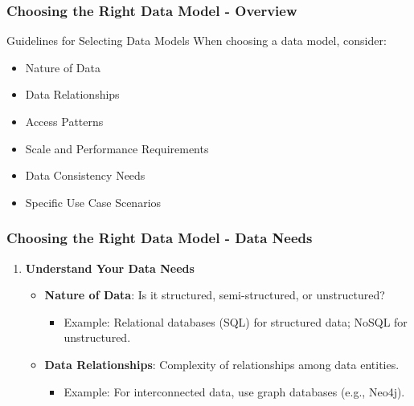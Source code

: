 \documentclass[aspectratio=169]{beamer}
\begin{document}
\begin{frame}[fragile]
    \frametitle{Choosing the Right Data Model - Overview}
    \begin{block}{Guidelines for Selecting Data Models}
        When choosing a data model, consider:
        \begin{itemize}
            \item Nature of Data
            \item Data Relationships
            \item Access Patterns
            \item Scale and Performance Requirements
            \item Data Consistency Needs
            \item Specific Use Case Scenarios
        \end{itemize}
    \end{block}
\end{frame}

\begin{frame}[fragile]
    \frametitle{Choosing the Right Data Model - Data Needs}
    \begin{enumerate}
        \item \textbf{Understand Your Data Needs}
        \begin{itemize}
            \item \textbf{Nature of Data}: Is it structured, semi-structured, or unstructured?
                \begin{itemize}
                    \item Example: Relational databases (SQL) for structured data; NoSQL for unstructured.
                \end{itemize}
            \item \textbf{Data Relationships}: Complexity of relationships among data entities.
                \begin{itemize}
                    \item Example: For interconnected data, use graph databases (e.g., Neo4j).
                \end{itemize}
        \end{itemize}
    \end{enumerate}
\end{frame}
\end{document}
